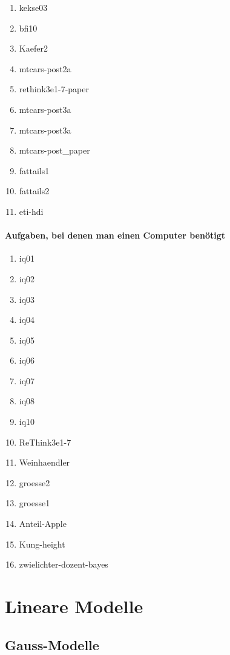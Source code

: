 \documentclass[
  ngerman,
  letterpaper,
  twoside,
  open=any]{scrbook}
\providecommand{\tightlist}{%
  \setlength{\itemsep}{0pt}\setlength{\parskip}{0pt}}\usepackage{longtable,booktabs,array}
\theoremstyle{definition}
\theoremstyle{plain}
\theoremstyle{definition}
\theoremstyle{definition}
\theoremstyle{definition}
\theoremstyle{definition}
\theoremstyle{remark}
\begin{document}
\begin{enumerate}
\def\labelenumi{\arabic{enumi}.}
\tightlist
\item
  kekse03
\item
  bfi10
\item
  Kaefer2
\item
  mtcars-post2a
\item
  rethink3e1-7-paper
\item
  mtcars-post3a
\item
  mtcars-post3a
\item
  mtcars-post\_paper
\item
  fattails1
\item
  fattails2
\item
  eti-hdi
\end{enumerate}

\subsection{Aufgaben, bei denen man einen Computer
benötigt}\label{aufgaben-bei-denen-man-einen-computer-benuxf6tigt}

\begin{enumerate}
\def\labelenumi{\arabic{enumi}.}
\tightlist
\item
  iq01
\item
  iq02
\item
  iq03
\item
  iq04
\item
  iq05
\item
  iq06
\item
  iq07
\item
  iq08
\item
  iq10
\item
  ReThink3e1-7
\item
  Weinhaendler
\item
  groesse2
\item
  groesse1
\item
  Anteil-Apple
\item
  Kung-height
\item
  zwielichter-dozent-bayes
\end{enumerate}

\part{Lineare Modelle}

\chapter{Gauss-Modelle}\label{gauss-modelle}
\end{document}
